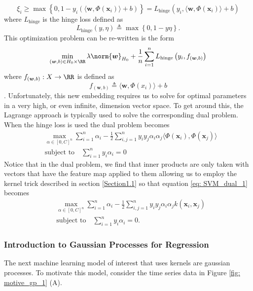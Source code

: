 \[
    \xi_i \geq \max \left\{ 0, 1 - y_i \left( \langle \bm{w} , \Phi \left( \bm{x}_i \right) \rangle + b \right)  \right\} = L_{\text{hinge}} \left( y_i , \langle \bm{w} , \Phi \left( \bm{x}_i \right) \rangle + b \right)
\]
where $L_{\text{hinge}}$ is the hinge loss defined as
\[
    L_{\text{hinge}} \left( y,\eta \right) \triangleq \max \left\{ 0,1-y\eta \right\}.
\]
This optimization problem can be re-written is the form
\[
    \min_{\left( \bm{w} , b \right) \in H_0 \times \RR} \lambda \norm{\bm{w}}_{H_0} + \frac{1}{n} \sum_{i=1}^{n} L_{\text{hinge}} \left( y_i , f_{\left( \bm{w} , b \right)} \right)
\]
where $f_{\left( \bm{w} , b \right)} : X \to \RR$ is defined as
\[
    f_{\left( \bm{w} , b \right)} \triangleq \langle \bm{w} , \Phi \left( x_i \right) \rangle + b
\]
\cite{SteinwartIngo2008SVMb}. Unfortunately, this new embedding requires us to solve for optimal parameters in a very high, or even infinite, dimension vector space. To get around this, the Lagrange approach is typically used to solve the corresponding dual problem. When the hinge loss is used the dual problem becomes
\begin{align} \label{eq: SVM_dual_1}
     & \max_{\alpha \in \left[ 0,C \right]^n} \sum_{i=1}^{n} \alpha_i - \frac{1}{2} \sum_{i,j=1}^{n} y_i y_j \alpha_i \alpha_j \langle \Phi \left( \bm{x}_i \right), \Phi \left( \bm{x}_j \right) \rangle \nonumber \\
     & \text{subject to} \quad \sum_{i=1}^{n} y_i \alpha_i = 0
\end{align}
Notice that in the dual problem, we find that inner products are only taken with vectors that have the feature map applied to them allowing us to employ the kernel trick described in section \ref{Section1.1} so that equation \ref{eq: SVM_dual_1} becomes
\begin{align*}
     & \max_{\alpha \in \left[ 0,C \right]^n} \sum_{i=1}^{n} \alpha_i - \frac{1}{2} \sum_{i,j=1}^{n} y_i y_j \alpha_i \alpha_j k \left( \bm{x}_i, \bm{x}_j \right) \\
     & \text{subject to} \quad \sum_{i=1}^{n} y_i \alpha_i = 0.
\end{align*}

\subsubsection{Introduction to Gaussian Processes for Regression}\label{Section1.4.2}
The next machine learning model of interest that uses kernels are gaussian processes. To motivate this model, consider the time series data in Figure \ref{fig: motive_gp_1} (A).

